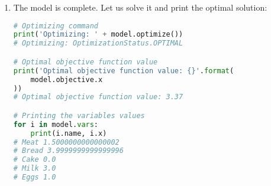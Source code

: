 \begin{enumerate}
    \item The model is complete. Let us solve it and print the optimal solution:
    \begin{lstlisting}[language=Python]
# Optimizing command
print('Optimizing: ' + model.optimize())
# Optimizing: OptimizationStatus.OPTIMAL

# Optimal objective function value
print('Optimal objective function value: {}'.format(
    model.objective.x
))
# Optimal objective function value: 3.37

# Printing the variables values
for i in model.vars:
    print(i.name, i.x)
# Meat 1.5000000000000002
# Bread 3.9999999999999996
# Cake 0.0
# Milk 3.0
# Eggs 1.0
\end{lstlisting}
\end{enumerate}
